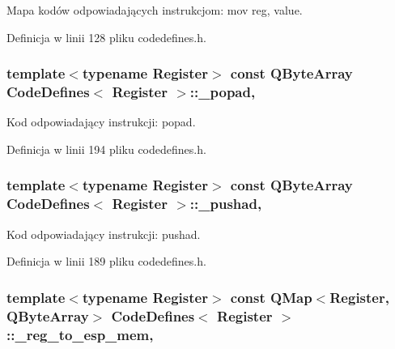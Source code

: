Mapa kodów odpowiadających instrukcjom\-: mov reg, value. 



Definicja w linii 128 pliku codedefines.\-h.

\hypertarget{class_code_defines_a1fe4292fe5f270ca2986744ac768cab4}{
\subsubsection[{\-\_\-popad}]{\setlength{\rightskip}{0pt plus 5cm}template$<$typename Register$>$ const Q\-Byte\-Array {\bf Code\-Defines}$<$ Register $>$\-::\-\_\-popad\hspace{0.3cm}{\ttfamily [static]}, {\ttfamily [private]}}}\label{class_code_defines_a1fe4292fe5f270ca2986744ac768cab4}


Kod odpowiadający instrukcji\-: popad. 



Definicja w linii 194 pliku codedefines.\-h.

\hypertarget{class_code_defines_a619c40323fbd1917a50692407d8c86d4}{
\subsubsection[{\-\_\-pushad}]{\setlength{\rightskip}{0pt plus 5cm}template$<$typename Register$>$ const Q\-Byte\-Array {\bf Code\-Defines}$<$ Register $>$\-::\-\_\-pushad\hspace{0.3cm}{\ttfamily [static]}, {\ttfamily [private]}}}\label{class_code_defines_a619c40323fbd1917a50692407d8c86d4}


Kod odpowiadający instrukcji\-: pushad. 



Definicja w linii 189 pliku codedefines.\-h.

\hypertarget{class_code_defines_a866f6d3f2142fce7db16fe897fe48b76}{
\subsubsection[{\-\_\-reg\-\_\-to\-\_\-esp\-\_\-mem}]{\setlength{\rightskip}{0pt plus 5cm}template$<$typename Register$>$ const Q\-Map$<$Register, Q\-Byte\-Array$>$ {\bf Code\-Defines}$<$ Register $>$\-::\-\_\-reg\-\_\-to\-\_\-esp\-\_\-mem\hspace{0.3cm}{\ttfamily [static]}, {\ttfamily [private]}}}\label{class_code_defines_a866f6d3f2142fce7db16fe897fe48b76}


